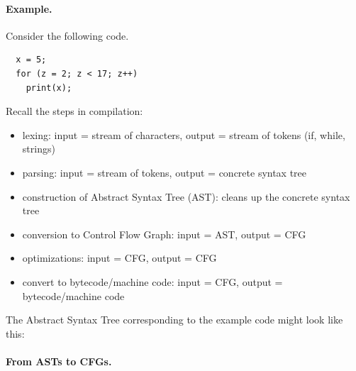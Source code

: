 \documentclass[11pt]{article}
\begin{document}
\paragraph{Example.} Consider the following code.
\begin{lstlisting}
  x = 5;
  for (z = 2; z < 17; z++)
    print(x);
\end{lstlisting}

Recall the steps in compilation:
\begin{itemize}
\item lexing: input = stream of characters, output = stream of tokens (if, while, strings)
\item parsing: input = stream of tokens, output = concrete syntax tree
\item construction of Abstract Syntax Tree (AST): cleans up the concrete syntax tree
\item conversion to Control Flow Graph: input = AST, output = CFG
\item optimizations: input = CFG, output = CFG
\item convert to bytecode/machine code: input = CFG, output = bytecode/machine code
\end{itemize}

The Abstract Syntax Tree corresponding to the example code might look like this:

\begin{center}
\end{center}

\paragraph{From ASTs to CFGs.}
\end{document}
